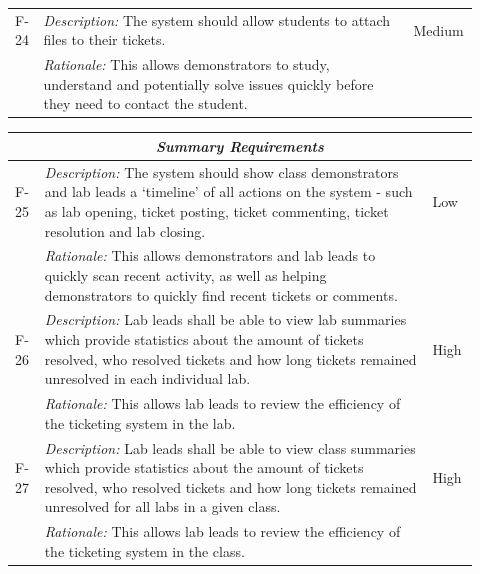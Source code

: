 \begin{table}[H]
\begin{tabular}{|p{0.05\linewidth} | p{0.78\linewidth} |p{0.09\linewidth}|}
      \hline\hline
 F-24 & \textit{Description:} The system should allow students to attach files to their tickets. & Medium\\
  \cline{2-2}
  & \textit{Rationale:} This allows demonstrators to study, understand and potentially solve issues quickly before they need to contact the student. & \\
  \hline
 
 \end{tabular}
\end{table}
 
 \begin{table}[H]
\small
\begin{tabular}{|p{0.05\linewidth} | p{0.78\linewidth} |p{0.09\linewidth}|}
 
  \multicolumn{3}{c}{\textit{\textbf{Summary Requirements}}}\\
  
          \hline
 F-25 & \textit{Description:} The system should show class demonstrators and lab leads a `timeline' of all actions on the system - such as lab opening, ticket posting, ticket commenting, ticket resolution and lab closing. & Low\\
  \cline{2-2}
  & \textit{Rationale:} This allows demonstrators and lab leads to quickly scan recent activity, as well as helping demonstrators to quickly find recent tickets or comments. & \\
  
\hline\hline
 F-26 & \textit{Description:} Lab leads shall be able to view lab summaries which provide statistics about the amount of tickets resolved, who resolved tickets and how long tickets remained unresolved in each individual lab. & High\\
  \cline{2-2}
  & \textit{Rationale:} This allows lab leads to review the efficiency of the ticketing system in the lab. & \\

 \hline\hline
 F-27 & \textit{Description:} Lab leads shall be able to view class summaries which provide statistics about the amount of tickets resolved, who resolved tickets and how long tickets remained unresolved for all labs in a given class. & High\\
  \cline{2-2}
  & \textit{Rationale:} This allows lab leads to review the efficiency of the ticketing system in the class. & \\
  \hline
  
\end{tabular}
\end{table}

